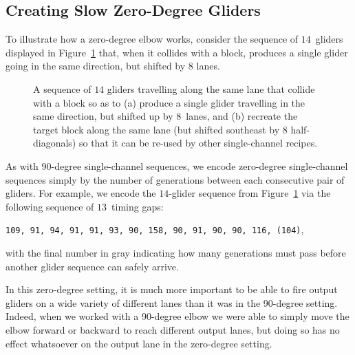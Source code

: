 \subsection{Creating Slow Zero-Degree Gliders}\label{sec:single_channel_zero_make_slow}

To illustrate how a zero-degree elbow works, consider the sequence of $14$~gliders displayed in Figure~\ref{fig:lane_8_0degree} that, when it collides with a block, produces a single glider going in the same direction, but shifted by $8$ lanes.

\begin{figure}[!htb]
	\centering
	\caption{A sequence of $14$ gliders travelling along the same lane that collide with a block so as to (a) produce a single glider travelling in the same direction, but shifted up by $8$~lanes, and (b) recreate the target block along the same lane (but shifted southeast by 8 half-diagonals) so that it can be re-used by other single-channel recipes.}\label{fig:lane_8_0degree}
\end{figure}

As with $90$-degree single-channel sequences, we encode zero-degree single-channel sequences simply by the number of generations between each consecutive pair of gliders. For example, we encode the $14$-glider sequence from Figure~\ref{fig:lane_8_0degree} via the following sequence of $13$~timing gaps:
\begin{center}
	\texttt{109, 91, 94, 91, 91, 93, 90, 158, 90, 91, 90, 90, 116, {\color{gray}(104)}},
\end{center}
with the final number in gray indicating how many generations must pass before another glider sequence can safely arrive.

In this zero-degree setting, it is much more important to be able to fire output gliders on a wide variety of different lanes than it was in the 90-degree setting. Indeed, when we worked with a 90-degree elbow we were able to simply move the elbow forward or backward to reach different output lanes, but doing so has no effect whatsoever on the output lane in the zero-degree setting.

